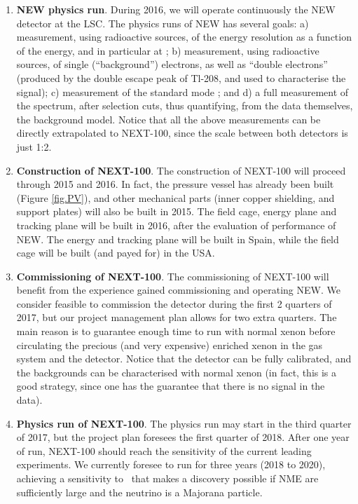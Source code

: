 \begin{enumerate}
\item {\bf NEW physics run}. During 2016, we will operate continuously the NEW detector at the LSC. The physics runs of NEW has several goals: a) measurement, using radioactive sources, of the energy resolution as a function of the energy, and in particular at \Qbb; b) measurement, using radioactive sources, of single (``background'') electrons, as well as ``double electrons'' (produced by the double escape peak of Tl-208, and used to characterise the signal); c) measurement of the standard mode \bbtnu; and d) a full measurement of the spectrum, after selection cuts, thus quantifying, from the data themselves, the background model. Notice that all the above measurements can be directly extrapolated to NEXT-100, since the scale between both detectors is just 1:2. 
%

\item {\bf Construction of NEXT-100}. The construction of NEXT-100 will proceed through 2015 and 2016. In fact, the pressure vessel has already been built (Figure \ref{fig.PV}), and other mechanical parts (inner copper shielding, and support plates) will also be built in 2015. The field cage, energy plane and tracking plane will be built in 2016, after the evaluation of performance of NEW. The energy and tracking plane will be built in Spain, while the field cage will be built (and payed for) in the USA.

\item {\bf Commissioning of NEXT-100}. The commissioning of NEXT-100 will benefit from the experience gained commissioning and operating NEW. We consider feasible to commission the detector during the first 2 quarters of 2017, but our project management plan allows for two extra quarters. The main reason is to guarantee enough time to run with normal xenon before circulating the precious (and very expensive) enriched xenon in the gas system and the detector. Notice that the detector can be fully calibrated, and the backgrounds can be characterised with normal xenon (in fact, this is a good strategy, since one has the guarantee that there is no signal in the data).  

\item {\bf Physics run of NEXT-100}. The physics run may start in the third quarter of 2017, but the project plan foresees the first quarter of 2018. After one year of run, NEXT-100 should reach the sensitivity of the current leading experiments. We currently foresee to run for three years (2018 to 2020), achieving a sensitivity to \mbb\ that makes a discovery possible if NME are sufficiently large and the neutrino is a Majorana particle. 


\end{enumerate}
